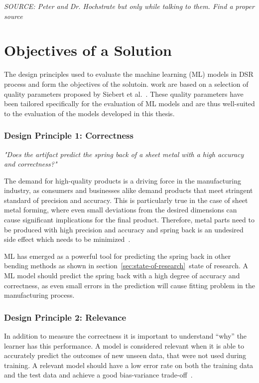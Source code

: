 \textit{SOURCE: Peter and Dr. Hochstrate but only while talking to them. Find a proper
source}


\section{Objectives of a Solution}\label{sec:objectives-of-a-solution}
The design principles used to evaluate the machine learning (ML) models in \ac{DSR}
process and form the objectives of the solutoin.
work are based on a selection of quality parameters proposed by
Siebert et al.~\cite{siebert2022construction}.
These quality parameters have been tailored specifically for the evaluation of ML
models and are thus well-suited to the evaluation of the models developed in this
thesis.

\subsubsection*{Design Principle 1: Correctness}
\textit{"Does the artifact predict the spring back of a sheet metal with a
high accuracy and
correctness?"}~\cite[p. 16]{siebert2022construction}

The demand for high-quality products is a driving force in the manufacturing industry,
as consumers and businesses alike demand products that meet stringent standard of
precision and accuracy.
This is particularly true in the case of sheet metal forming, where even small
deviations from the desired dimensions can cause significant implications for the final
product.
Therefore, metal parts need to be produced with high precision and accuracy and
spring back is an undesired side effect which needs to be minimized~\cite[p.1]{
    cruz_applicationmachinelearning_2021}.

\ac{ML} has emerged as a powerful tool for predicting the spring back in other bending
methods as shown in section~\ref{sec:state-of-research}~state of research.
A \ac{ML} model should predict the spring back with a high degree of accuracy and
correctness, as even small errors in the prediction will cause fitting problem in the
manufacturing process.

\subsubsection*{Design Principle 2: Relevance}
In addition to measure the correctness it is important to understand ``why''
the learner has this performance.
A model is considered relevant when it is able to accurately predict the outcomes of
new unseen data, that were not used during training.
A relevant model should have a low error rate on both the training data and the test
data and achieve a good bias-variance trade-off~\cite[p. 16]{siebert2022construction}.

